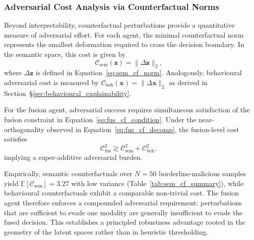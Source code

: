 \documentclass[lettersize,journal]{IEEEtran}
\begin{document}
\subsubsection*{Adversarial Cost Analysis via Counterfactual Norms}

Beyond interpretability, counterfactual perturbations provide a quantitative measure of
adversarial effort.
For each agent, the minimal counterfactual norm represents the smallest deformation
required to cross the decision boundary.
In the semantic space, this cost is given by
\begin{equation}
\mathcal{C}_{\mathrm{sem}}(\mathbf{z})
=
\lVert \Delta \mathbf{z} \rVert_2,
\label{eq:adv_cost_sem}
\end{equation}
where $\Delta \mathbf{z}$ is defined in Equation~\eqref{eq:sem_cf_norm}.
Analogously, behavioural adversarial cost is measured by
$\mathcal{C}_{\mathrm{beh}}(\mathbf{x}) = \lVert \Delta \mathbf{x} \rVert_2$
as derived in Section~\S\ref{sec:behavioural_explainability}.

For the fusion agent, adversarial success requires simultaneous satisfaction of the
fusion constraint in Equation~\eqref{eq:fus_cf_condition}.
Under the near-orthogonality observed in Equation~\eqref{eq:fus_cf_decomp}, the fusion-level
cost satisfies
\begin{equation}
\mathcal{C}_{\mathrm{fus}}^2
\gtrsim
\mathcal{C}_{\mathrm{sem}}^2
+
\mathcal{C}_{\mathrm{beh}}^2,
\label{eq:adv_cost_fusion}
\end{equation}
implying a super-additive adversarial burden.

Empirically, semantic counterfactuals over $N=50$ borderline-malicious samples yield
$\mathbb{E}[\mathcal{C}_{\mathrm{sem}}] = 3.27$ with low variance
(Table~\ref{tab:sem_cf_summary}), while behavioural counterfactuals exhibit a comparable non-trivial cost. The fusion agent therefore enforces a compounded adversarial requirement: perturbations that are sufficient to evade one modality are generally insufficient to evade the fused decision.
This establishes a principled robustness advantage rooted in the geometry of the latent spaces rather than in heuristic thresholding.
\end{document}
